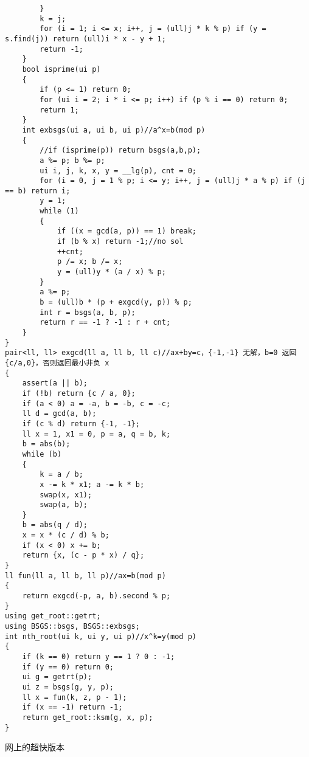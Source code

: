 \documentclass[12pt]{ctexart}
\begin{document}
\begin{lstlisting}
		}
		k = j;
		for (i = 1; i <= x; i++, j = (ull)j * k % p) if (y = s.find(j)) return (ull)i * x - y + 1;
		return -1;
	}
	bool isprime(ui p)
	{
		if (p <= 1) return 0;
		for (ui i = 2; i * i <= p; i++) if (p % i == 0) return 0;
		return 1;
	}
	int exbsgs(ui a, ui b, ui p)//a^x=b(mod p)
	{
		//if (isprime(p)) return bsgs(a,b,p);
		a %= p; b %= p;
		ui i, j, k, x, y = __lg(p), cnt = 0;
		for (i = 0, j = 1 % p; i <= y; i++, j = (ull)j * a % p) if (j == b) return i;
		y = 1;
		while (1)
		{
			if ((x = gcd(a, p)) == 1) break;
			if (b % x) return -1;//no sol
			++cnt;
			p /= x; b /= x;
			y = (ull)y * (a / x) % p;
		}
		a %= p;
		b = (ull)b * (p + exgcd(y, p)) % p;
		int r = bsgs(a, b, p);
		return r == -1 ? -1 : r + cnt;
	}
}
pair<ll, ll> exgcd(ll a, ll b, ll c)//ax+by=c，{-1,-1} 无解，b=0 返回 {c/a,0}，否则返回最小非负 x
{
	assert(a || b);
	if (!b) return {c / a, 0};
	if (a < 0) a = -a, b = -b, c = -c;
	ll d = gcd(a, b);
	if (c % d) return {-1, -1};
	ll x = 1, x1 = 0, p = a, q = b, k;
	b = abs(b);
	while (b)
	{
		k = a / b;
		x -= k * x1; a -= k * b;
		swap(x, x1);
		swap(a, b);
	}
	b = abs(q / d);
	x = x * (c / d) % b;
	if (x < 0) x += b;
	return {x, (c - p * x) / q};
}
ll fun(ll a, ll b, ll p)//ax=b(mod p)
{
	return exgcd(-p, a, b).second % p;
}
using get_root::getrt;
using BSGS::bsgs, BSGS::exbsgs;
int nth_root(ui k, ui y, ui p)//x^k=y(mod p)
{
	if (k == 0) return y == 1 ? 0 : -1;
	if (y == 0) return 0;
	ui g = getrt(p);
	ui z = bsgs(g, y, p);
	ll x = fun(k, z, p - 1);
	if (x == -1) return -1;
	return get_root::ksm(g, x, p);
}
\end{lstlisting}

网上的超快版本
\end{document}
